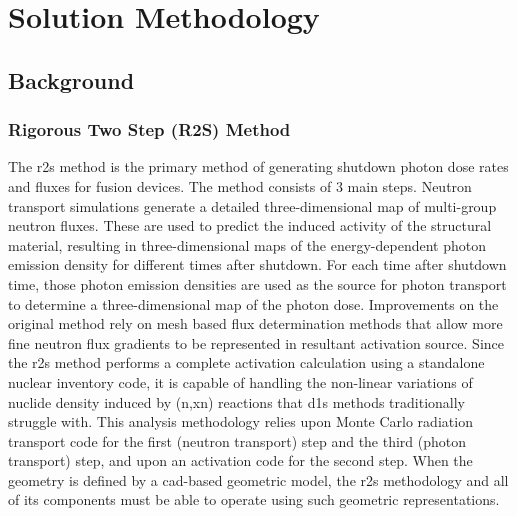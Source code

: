 \documentclass[12pt]{article}
\begin{document}
\newpage
\section{Solution Methodology}
\subsection{Background}
\subsubsection{Rigorous Two Step (R2S) Method}
The \gls{r2s} method \cite{r2s} is the primary method of generating shutdown
photon dose rates and fluxes for fusion devices. The method consists of 3 main
steps.  Neutron transport simulations generate a detailed three-dimensional
map of multi-group neutron fluxes.  These are used to predict the induced
activity of the structural material, resulting in three-dimensional maps of
the energy-dependent photon emission density for different times after
shutdown.  For each time after shutdown time, those photon emission densities are
used as the source for photon transport to determine a three-dimensional map
of the photon dose.  Improvements on the original method rely on mesh based
flux determination methods \cite{mcr2s,r2smesh,r2suned,pyne_r2s,Biondo201677} that allow
more fine neutron flux gradients to be represented in resultant activation
source.  Since the \gls{r2s} method performs a complete activation calculation
using a standalone nuclear inventory code, it is capable of handling the
non-linear variations of nuclide density induced by (n,xn) reactions
that \gls{d1s} methods traditionally struggle with.  This analysis methodology
relies upon Monte Carlo radiation transport code for the first 
(neutron transport) step and the third (photon transport) step, and upon an 
activation code for the second step.  When the geometry is defined by a 
\gls{cad}-based geometric model, the \gls{r2s} methodology and all of its components
must be able to operate using such geometric representations.
\end{document}
